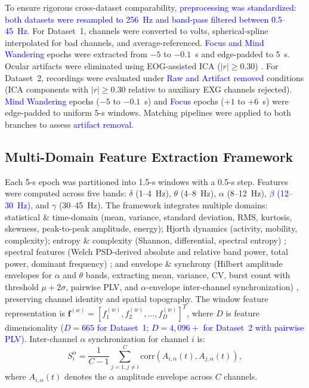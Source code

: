 \documentclass[conference]{IEEEtran}
\begin{document}
To ensure rigorous cross-dataset comparability, \textcolor{blue}{preprocessing was standardized: both datasets were resampled to 256~Hz and band-pass filtered between 0.5--45~Hz}. For Dataset~1, channels were converted to volts, spherical-spline interpolated for bad channels, and average-referenced. \textcolor{blue}{Focus and Mind Wandering} epochs were extracted from $-5$ to $-0.1$~s and edge-padded to 5~s. Ocular artifacts were eliminated using EOG-assisted ICA ($|r|\geq 0.30$) \cite{delorme2004eeglab}. For Dataset~2, recordings were evaluated under \textcolor{blue}{Raw and Artifact removed} conditions (ICA components with $|r|\geq 0.30$ relative to auxiliary EXG channels rejected). \textcolor{blue}{Mind Wandering} epochs ($-5$ to $-0.1$~s) and \textcolor{blue}{Focus} epochs ($+1$ to $+6$~s) were edge-padded to uniform 5-s windows. Matching pipelines were applied to both branches to assess \textcolor{blue}{artifact removal}.

\subsection{Multi-Domain Feature Extraction Framework}

Each 5-s epoch was partitioned into 1.5-s windows with a 0.5-s step. Features were computed across five bands: $\delta$ (1--4~Hz), $\theta$ (4--8~Hz), $\alpha$ (8--12~Hz), \textcolor{blue}{$\beta$ (12--30~Hz)}, and $\gamma$ (30--45~Hz).
The framework integrates multiple domains: statistical \& time-domain (mean, variance, standard deviation, RMS, kurtosis, skewness, peak-to-peak amplitude, energy); Hjorth dynamics (activity, mobility, complexity); entropy \& complexity (Shannon, differential, spectral entropy) \cite{zhang2018integration}; spectral features (Welch PSD-derived absolute and relative band power, total power, dominant frequency) \cite{safi2021early}; and envelope \& synchrony (Hilbert amplitude envelopes for $\alpha$ and $\theta$ bands, extracting mean, variance, CV, burst count with threshold $\mu+2\sigma$, pairwise PLV, and $\alpha$-envelope inter-channel synchronization) \cite{o2017detecting}, preserving channel identity and spatial topography.
The window feature representation is $\mathbf{f}^{(w)} = [f_1^{(w)}, f_2^{(w)}, \ldots, f_D^{(w)}]^{T}$, where $D$ is feature dimensionality \textcolor{blue}{($D = 665$ for Dataset~1; $D = 4,096+$ for Dataset~2 with pairwise PLV)}. Inter-channel $\alpha$ synchronization for channel $i$ is:
\begin{equation}
S_i^{\alpha} = \frac{1}{C-1} \sum_{j=1, j\neq i}^{C} \mathrm{corr}\left(A_{i,\alpha}(t), A_{j,\alpha}(t)\right),
\end{equation}
where $A_{i,\alpha}(t)$ denotes the $\alpha$ amplitude envelope across $C$ channels.
\end{document}

